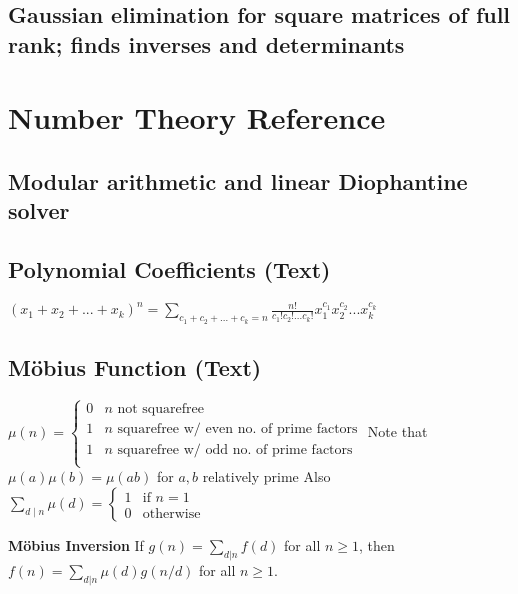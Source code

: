 \documentclass[12pt]{extarticle}
\begin{document}
\begin{multicols*}{2}
\subsection{Gaussian elimination for square matrices of full rank; finds
inverses and determinants} %


\section{Number Theory Reference}

% 

\subsection{Modular arithmetic and linear Diophantine solver} %


\subsection{Polynomial Coefficients (Text)} %
$(x_1 + x_2 + ... + x_k)^n = \sum_{c_1 + c_2 + ... + c_k = n}
\frac{n!}{c_1! c_2! ... c_k!} x_1^{c_1} x_2^{c_2} ... x_k^{c_k}$

\subsection{M\"obius Function (Text)} %
$\mu(n) = \begin{cases}
0 & \text{$n$ not squarefree} \\
1 & \text{$n$ squarefree w/ even no. of prime factors} \\
1 & \text{$n$ squarefree w/ odd no. of prime factors} \\
\end{cases}$
Note that $\mu(a) \mu(b) = \mu(ab)$ for $a, b$ relatively prime
Also $\sum_{d \mid n} \mu(d) = \begin{cases} 1 & \text{if $n = 1$} \\
0 & \text{otherwise} \end{cases}$

\textbf{M\"obius Inversion}
If $g(n) = \sum_{d|n} f(d)$ for all $n \ge 1$, then
$f(n) = \sum_{d|n} \mu(d)g(n/d)$ for all $n \ge 1$.



\end{multicols*}
\end{document}
